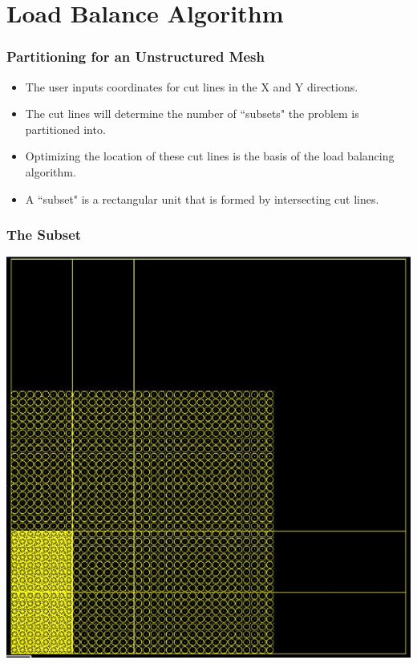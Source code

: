 \documentclass[compress]{beamer}
\begin{document}
\section{Load Balance Algorithm}

\begin{frame}[t]\frametitle{Partitioning for an Unstructured Mesh}
\begin{block}{}
	\begin{itemize}
	\item The user inputs coordinates for cut lines in the X and Y directions.
	\item The cut lines will determine the number of ``subsets" the problem is partitioned into.
	\item Optimizing the location of these cut lines is the basis of the load balancing algorithm.
	\item A ``subset" is a rectangular unit that is formed by intersecting cut lines.
	\end{itemize}
\end{block}
\end{frame}

\begin{frame}[t]\frametitle{The Subset}
\centering
\includegraphics[width = 12 cm, height = 7 cm ]{figures/subsetlattice.png}
\end{frame}
\end{document}
